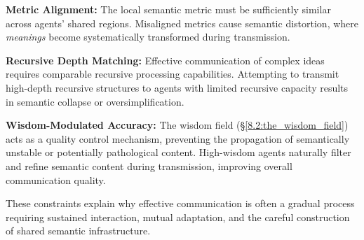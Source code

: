 \textbf{Metric Alignment:} The local semantic metric must be sufficiently similar across agents' shared regions. Misaligned metrics cause semantic distortion, where \textit{meanings} become systematically transformed during transmission.

\textbf{Recursive Depth Matching:} Effective communication of complex ideas requires comparable recursive processing capabilities. Attempting to transmit high-depth recursive structures to agents with limited recursive capacity results in semantic collapse or oversimplification.

\textbf{Wisdom-Modulated Accuracy:} The wisdom field (\S\ref{8.2:the_wisdom_field}) acts as a quality control mechanism, preventing the propagation of semantically unstable or potentially pathological content. High-wisdom agents naturally filter and refine semantic content during transmission, improving overall communication quality.

These constraints explain why effective communication is often a gradual process requiring sustained interaction, mutual adaptation, and the careful construction of shared semantic infrastructure. 